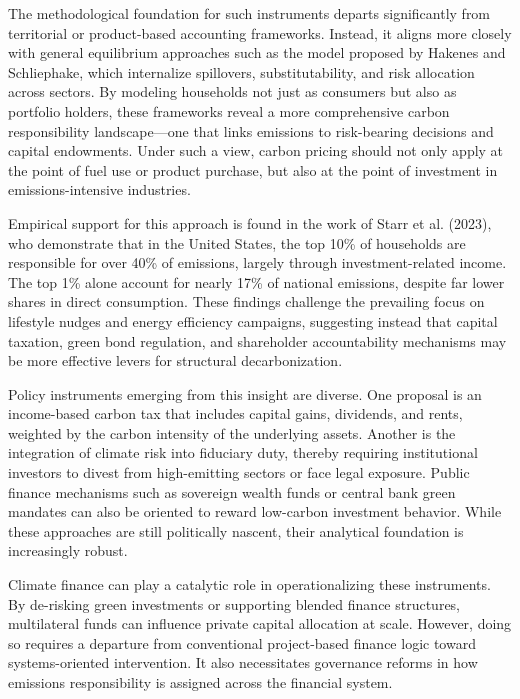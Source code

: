 \documentclass[12pt,a4paper]{article}%
\begin{document}
The methodological foundation for such instruments departs significantly from territorial or product-based accounting frameworks. Instead, it aligns more closely with general equilibrium approaches such as the model proposed by Hakenes and Schliephake, which internalize spillovers, substitutability, and risk allocation across sectors. By modeling households not just as consumers but also as portfolio holders, these frameworks reveal a more comprehensive carbon responsibility landscape—one that links emissions to risk-bearing decisions and capital endowments. Under such a view, carbon pricing should not only apply at the point of fuel use or product purchase, but also at the point of investment in emissions-intensive industries.

Empirical support for this approach is found in the work of Starr et al. (2023), who demonstrate that in the United States, the top 10\% of households are responsible for over 40\% of emissions, largely through investment-related income. The top 1\% alone account for nearly 17\% of national emissions, despite far lower shares in direct consumption. These findings challenge the prevailing focus on lifestyle nudges and energy efficiency campaigns, suggesting instead that capital taxation, green bond regulation, and shareholder accountability mechanisms may be more effective levers for structural decarbonization.

Policy instruments emerging from this insight are diverse. One proposal is an income-based carbon tax that includes capital gains, dividends, and rents, weighted by the carbon intensity of the underlying assets. Another is the integration of climate risk into fiduciary duty, thereby requiring institutional investors to divest from high-emitting sectors or face legal exposure. Public finance mechanisms such as sovereign wealth funds or central bank green mandates can also be oriented to reward low-carbon investment behavior. While these approaches are still politically nascent, their analytical foundation is increasingly robust.

Climate finance can play a catalytic role in operationalizing these instruments. By de-risking green investments or supporting blended finance structures, multilateral funds can influence private capital allocation at scale. However, doing so requires a departure from conventional project-based finance logic toward systems-oriented intervention. It also necessitates governance reforms in how emissions responsibility is assigned across the financial system.
\end{document}

